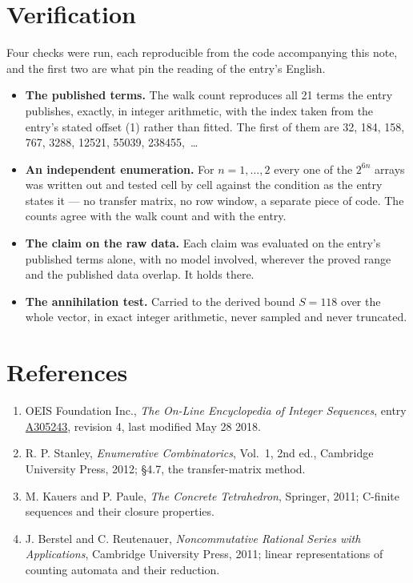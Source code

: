 \documentclass[11pt]{article}
\theoremstyle{definition}
\begin{document}
\section{Verification}

Four checks were run, each reproducible from the code accompanying this note, and the first two are what pin the reading of the entry's English.

\begin{itemize}

\item {\bfseries The published terms.} The walk count reproduces all 21 terms the entry publishes, exactly, in integer arithmetic, with the index taken from the entry's stated offset (1) rather than fitted. The first of them are 32, 184, 158, 767, 3288, 12521, 55039, 238455,~\dots

\item {\bfseries An independent enumeration.} For $n = 1,\dots,2$ every one of the $2^{6n}$ arrays was written out and tested cell by cell against the condition as the entry states it --- no transfer matrix, no row window, a separate piece of code. The counts agree with the walk count and with the entry.

\item {\bfseries The claim on the raw data.} Each claim was evaluated on the entry's published terms alone, with no model involved, wherever the proved range and the published data overlap. It holds there.

\item {\bfseries The annihilation test.} Carried to the derived bound $S = 118$ over the whole vector, in exact integer arithmetic, never sampled and never truncated.

\end{itemize}

\section{References}

\begin{enumerate}

\item OEIS Foundation Inc., \emph{The On-Line Encyclopedia of Integer Sequences}, entry \href{https://oeis.org/A305243}{A305243}, revision 4, last modified May 28 2018.

\item R. P. Stanley, \emph{Enumerative Combinatorics}, Vol.~1, 2nd ed., Cambridge University Press, 2012; \S4.7, the transfer-matrix method.

\item M. Kauers and P. Paule, \emph{The Concrete Tetrahedron}, Springer, 2011; C-finite sequences and their closure properties.

\item J. Berstel and C. Reutenauer, \emph{Noncommutative Rational Series with Applications}, Cambridge University Press, 2011; linear representations of counting automata and their reduction.

\end{enumerate}
\end{document}
